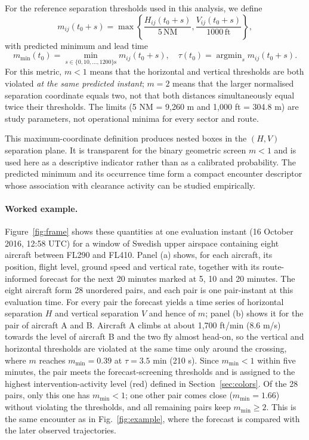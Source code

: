 \documentclass[aerospace,article,submit,moreauthors]{Definitions/mdpi}
\newcommand{\mmin}{m_{\min}}
\begin{document}
For the reference separation thresholds used in this analysis, we define
\begin{equation}\label{eq:geometry}
 m_{ij}(t_0+s)=\max\!\left\{\frac{H_{ij}(t_0+s)}{5\,\mathrm{NM}},\frac{V_{ij}(t_0+s)}{1000\,\mathrm{ft}}\right\},
\end{equation}
with predicted minimum and lead time
\begin{equation}\label{eq:minimum}
 \mmin(t_0)=\min_{s\in\{0,10,\ldots,1200\}\mathrm{s}}m_{ij}(t_0+s),\quad
 \tau(t_0)=\mathop{\mathrm{argmin}}_{s}m_{ij}(t_0+s).
\end{equation}
For this metric, $m<1$ means that the horizontal and vertical thresholds are both violated \emph{at the same predicted instant}; $m=2$ means that the larger normalised separation coordinate equals two, not that both distances simultaneously equal twice their thresholds. The limits (5 NM = 9,260 m and 1,000 ft = 304.8 m) are study parameters, not operational minima for every sector and route.

This maximum-coordinate definition produces nested boxes in the $(H,V)$ separation plane. It is transparent for the binary geometric screen $m<1$ and is used here as a descriptive indicator rather than as a calibrated probability. The predicted minimum and its occurrence time form a compact encounter descriptor whose association with clearance activity can be studied empirically.

\paragraph{Worked example.} Figure~\ref{fig:frame} shows these quantities at one evaluation instant (16 October 2016, 12:58 UTC) for a window of Swedish upper airspace containing eight aircraft between FL290 and FL410. Panel (a) shows, for each aircraft, its position, flight level, ground speed and vertical rate, together with its route-informed forecast for the next 20 minutes marked at 5, 10 and 20 minutes. The eight aircraft form 28 unordered pairs, and each pair is one pair-instant at this evaluation time. For every pair the forecast yields a time series of horizontal separation $H$ and vertical separation $V$ and hence of $m$; panel (b) shows it for the pair of aircraft A and B. Aircraft A climbs at about 1,700 ft/min (8.6 m/s) towards the level of aircraft B and the two fly almost head-on, so the vertical and horizontal thresholds are violated at the same time only around the crossing, where $m$ reaches $\mmin=0.39$ at $\tau=3.5$ min (210 s). Since $\mmin<1$ within five minutes, the pair meets the forecast-screening thresholds and is assigned to the highest intervention-activity level (red) defined in Section~\ref{sec:colors}. Of the 28 pairs, only this one has $\mmin<1$; one other pair comes close ($\mmin=1.66$) without violating the thresholds, and all remaining pairs keep $\mmin\ge 2$. This is the same encounter as in Fig.~\ref{fig:example}, where the forecast is compared with the later observed trajectories.
\end{document}
